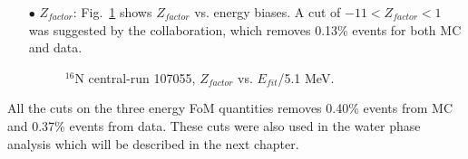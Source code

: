 \begin{itemize}
	\item[$\bullet$]$Z_{factor}$:
	Fig.~\ref{energyFOM_Zfactor} shows $Z_{factor}$ vs. energy biases. A cut of $-11<Z_{factor}<1$ was suggested by the collaboration, which removes 0.13\% events for both MC and data.		
	\begin{figure}[!htb]
		\centering
		\caption{$^{16}$N central-run 107055, $Z_{factor}$ vs. $E_{fit}$/5.1 MeV.}
		\label{energyFOM_Zfactor}
	\end{figure}
	
	
\end{itemize}

All the cuts on the three energy FoM quantities removes 0.40\% events from MC and 0.37\% events from data. These cuts were also used in the water phase analysis which will be described in the next chapter.

